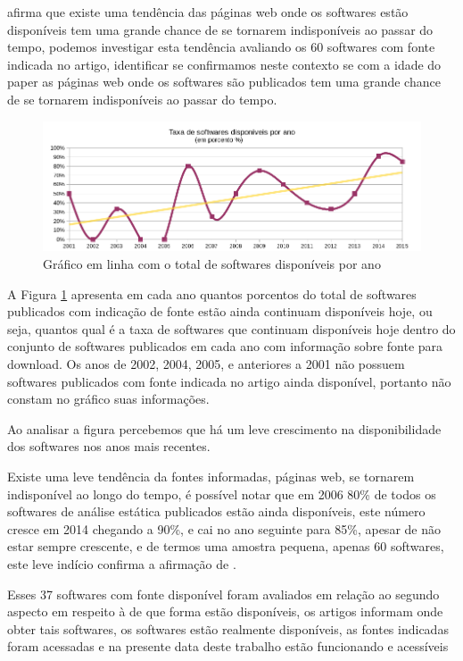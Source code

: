  afirma que existe uma tendência das páginas
web onde os softwares estão disponíveis tem uma grande chance de se tornarem
indisponíveis ao passar do tempo, podemos investigar esta tendência 
avaliando os 60 softwares com fonte indicada no artigo,
identificar se confirmamos neste contexto se com a idade do paper
as páginas web onde os softwares são publicados tem uma grande chance de se
tornarem indisponíveis ao passar do tempo.

\begin{figure}[h]
  \center
  \includegraphics[scale=0.65]{imagens/softwares-disponivel-por-ano.png}
  \caption{Gráfico em linha com o total de softwares disponíveis por ano}
  \label{softwares-disponivel-por-ano}
\end{figure}

A Figura \ref{softwares-disponivel-por-ano} apresenta em cada ano quantos
porcentos do total de softwares publicados com indicação de fonte estão ainda continuam
disponíveis hoje, ou seja, quantos qual é a taxa de softwares que continuam
disponíveis hoje dentro do conjunto de softwares publicados em cada ano com
informação sobre fonte para download.  Os anos de 2002, 2004, 2005, e
anteriores a 2001 não possuem softwares publicados com fonte indicada no artigo
ainda disponível, portanto não constam no gráfico suas informações.

Ao analisar a figura percebemos que há um leve crescimento na disponibilidade
dos softwares nos anos mais recentes.

Existe uma leve tendência da fontes informadas, páginas web, se tornarem
indisponível ao longo do tempo, é possível notar que em 2006 80\% de todos os
softwares de análise estática publicados estão ainda disponíveis, este número
cresce em 2014 chegando a 90\%, e cai no ano seguinte para 85\%, apesar de não
estar sempre crescente, e de termos uma amostra pequena, apenas 60 softwares,
este leve indício confirma a afirmação de .

Esses 37 softwares com fonte disponível foram avaliados em relação ao segundo
aspecto em respeito à de que forma estão disponíveis, os artigos informam onde
obter tais softwares, os softwares estão realmente disponíveis, as fontes
indicadas foram acessadas e na presente data deste trabalho estão funcionando e
acessíveis

